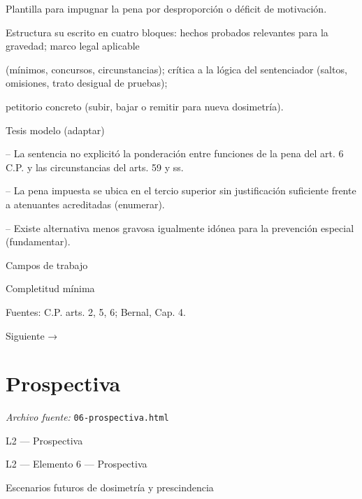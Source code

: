 \documentclass[11pt,a4paper]{article}
\begin{document}
    Plantilla para impugnar la pena por desproporción o déficit de motivación.\par


      Estructura su escrito en cuatro bloques: hechos probados relevantes para la gravedad; marco legal aplicable\par
      (mínimos, concursos, circunstancias); crítica a la lógica del sentenciador (saltos, omisiones, trato desigual de pruebas);\par
      petitorio concreto (subir, bajar o remitir para nueva dosimetría).\par



      Tesis modelo (adaptar)\par



-- La sentencia no explicitó la ponderación entre funciones de la pena del art. 6 C.P. y las circunstancias del arts. 59 y ss.\par


-- La pena impuesta se ubica en el tercio superior sin justificación suficiente frente a atenuantes acreditadas (enumerar).\par


-- Existe alternativa menos gravosa igualmente idónea para la prevención especial (fundamentar).\par





      Campos de trabajo\par



      Completitud mínima\par





      Fuentes: C.P. arts. 2, 5, 6; Bernal, Cap. 4.\par


    Siguiente →\par

\section{Prospectiva}
\noindent\textit{Archivo fuente:} \texttt{06-prospectiva.html}

L2 — Prospectiva\par





    L2 — Elemento 6 — Prospectiva\par
    Escenarios futuros de dosimetría y prescindencia\par
\end{document}
